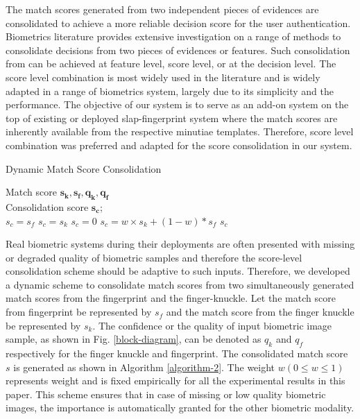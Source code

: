 The match scores generated from two independent pieces of evidences are consolidated to achieve a more reliable decision score for the user authentication. Biometrics literature \cite{maltoni2009handbook} provides extensive investigation on a range of methods to consolidate decisions from two pieces of evidences or features. Such consolidation from can be achieved at feature level, score level, or at the decision level. The score level combination is most widely used in the literature and is widely adapted \cite{jain2012biometric} in a range of biometrics system, largely due to its simplicity and the performance. The objective of our system is to serve as an add-on system on the top of existing or deployed slap-fingerprint system where the match scores are inherently available from the respective minutiae templates. Therefore, score level combination was preferred and adapted for the score consolidation in our system.  
\begin{algorithm}[h!]
    \renewcommand{\algorithmicrequire}{\textbf{Input:}}
    \renewcommand{\algorithmicensure}{\textbf{Output:}}
    \caption{Dynamic Match Score Consolidation}
    \begin{algorithmic}[1]
        \REQUIRE Match score $\bm{s_k, s_f, q_k, q_f}$ \\ 
        \ENSURE Consolidation score $\bm{s_c}$;\\
            \STATE $s_c = s_f$
        \ENDIF
            \STATE $s_c = s_k$
        \ENDIF
            \STATE $s_c = 0$
        \ELSE
            \STATE $s_c = w \times s_k + (1-w)*s_f$
        \ENDIF
        \RETURN $s_c$
    \end{algorithmic}
    \label{algorithm-2}
\end{algorithm}

Real biometric systems during their deployments are often presented with missing or degraded quality of biometric samples and therefore the score-level consolidation scheme should be adaptive to such inputs. Therefore, we developed a dynamic scheme to consolidate match scores from two simultaneously generated match scores from the fingerprint and the finger-knuckle. Let the match score from fingerprint be represented by $s_f$ and the match score from the finger knuckle be represented by $s_k$. The confidence or the quality of input biometric image sample, as shown in Fig. \ref{block-diagram}, can be denoted as $q_k$ and $q_f$ respectively for the finger knuckle and fingerprint. The consolidated match score $s$ is generated as shown in Algorithm \ref{algorithm-2}. The weight $w ( 0 \leq w \leq 1)$  represents weight and is fixed empirically for all the experimental results in this paper. This scheme ensures that in case of missing or low quality biometric images, the importance is automatically granted for the other biometric modality.  

